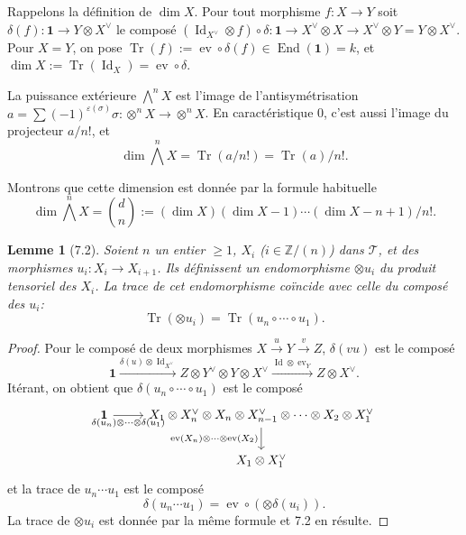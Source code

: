 \documentclass[12pt,a4paper]{article}
\theoremstyle{plain}
\newtheorem{lemma}[theorem]{Lemme}
\theoremstyle{definition}
\DeclareMathOperator{\End}{End}
\DeclareMathOperator{\Id}{Id}
\DeclareMathOperator{\ev}{ev}
\DeclareMathOperator{\Tr}{Tr}
\begin{document}
Rappelons la définition de $\dim X$. Pour tout morphisme $f : X \to Y$ soit $\delta(f) : \mathbf{1} \to Y \otimes X^\vee$ le composé $(\Id_{X^\vee} \otimes f) \circ \delta : \mathbf{1} \to X^\vee \otimes X \to X^\vee \otimes Y = Y \otimes X^\vee$. Pour $X = Y$, on pose $\Tr(f) := \ev \circ \delta(f) \in \End(\mathbf{1}) = k$, et $\dim X := \Tr(\Id_X) = \ev \circ \delta$.

La puissance extérieure $\bigwedge^n X$ est l'image de l'antisymétrisation $a = \sum (-1)^{\varepsilon(\sigma)} \sigma : \otimes^n X \to \otimes^n X$. En caractéristique 0, c'est aussi l'image du projecteur $a/n!$, et
\begin{equation}\label{eq:7.1.1}
\dim \bigwedge^n X = \Tr(a/n!) = \Tr(a)/n!.
\end{equation}

Montrons que cette dimension est donnée par la formule habituelle
\begin{equation}\label{eq:7.1.2}
\dim \bigwedge^n X = \binom{d}{n} := (\dim X)(\dim X - 1) \cdots (\dim X - n + 1)/n!.
\end{equation}

\begin{lemma}[7.2]
Soient $n$ un entier $\geq 1$, $X_i$ ($i \in \mathbb{Z}/(n)$) dans $\mathcal{T}$, et des morphismes $u_i : X_i \to X_{i+1}$. Ils définissent un endomorphisme $\otimes u_i$ du produit tensoriel des $X_i$. La trace de cet endomorphisme coïncide avec celle du composé des $u_i$:
\begin{equation}\label{eq:7.2.1}
\Tr(\otimes u_i) = \Tr(u_n \circ \cdots \circ u_1).
\end{equation}
\end{lemma}

\begin{proof}
Pour le composé de deux morphismes $X \xrightarrow{u} Y \xrightarrow{v} Z$, $\delta(vu)$ est le composé
\[
\mathbf{1} \xrightarrow{\delta(u) \otimes \Id_{X^\vee}} Z \otimes Y^\vee \otimes Y \otimes X^\vee \xrightarrow{\Id \otimes \ev_Y} Z \otimes X^\vee.
\]
Itérant, on obtient que $\delta(u_n \circ \cdots \circ u_1)$ est le composé
\[
\begin{tikzcd}
\mathbf{1} \arrow[r, "\delta(u_n) \otimes \cdots \otimes \delta(u_1)"'] & X_1 \otimes X_n^\vee \otimes X_n \otimes X_{n-1}^\vee \otimes \cdots \otimes X_2 \otimes X_1^\vee \arrow[d, "\ev(X_n) \otimes \cdots \otimes \ev(X_2)"'] \\
& X_1 \otimes X_1^\vee
\end{tikzcd}
\]
et la trace de $u_n \cdots u_1$ est le composé
\[
\delta(u_n \cdots u_1) = \ev \circ (\otimes \delta(u_i)).
\]
La trace de $\otimes u_i$ est donnée par la même formule et 7.2 en résulte.
\end{proof}
\end{document}
